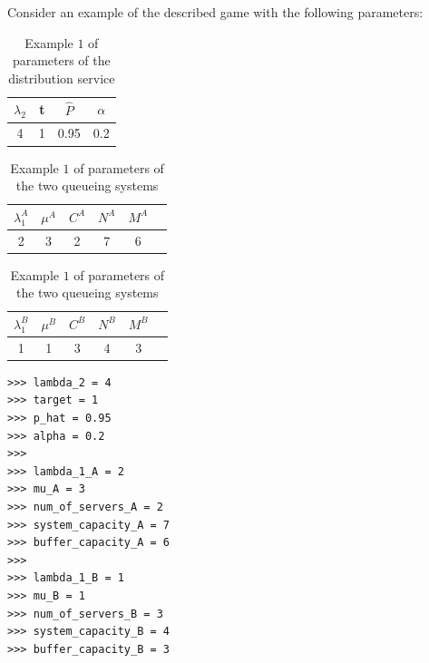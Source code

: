 Consider an example of the described game with the following parameters:

\begin{table}[H]
    \caption{Example \(1\) of parameters of the distribution service}
    \begin{center}
        \begin{tabular}{||c|c|c|c||}
            \hline
            \(\lambda_2\) & t & \footnotesize{\(\hat{P}\)} & \(\alpha\) \\
            \hline\hline
            4 & 1 & 0.95 & 0.2 \\
            \hline
        \end{tabular}
    \end{center}
    \label{tab:implemetation_dist_service_parameters}
\end{table}

\begin{table}[H]
    \caption{Example \(1\) of parameters of the two queueing systems}
    \begin{center}
        \begin{tabular}{||c|c|c|c|c|c||}
            \hline
            \(\lambda_1^A\) & \(\mu^A\) & \(C^A\) & \(N^A\) & \(M^A\) \\
            \hline
            2 & 3 & 2 & 7 & 6 \\
            \hline
        \end{tabular}

        \vspace{0.5cm}
        
        \begin{tabular}{||c|c|c|c|c|c||}
            \hline
            \(\lambda_1^B\) & \(\mu^B\) & \(C^B\) & \(N^B\) & \(M^B\) \\
            \hline
            1 & 1 & 3 & 4 & 3 \\
            \hline
        \end{tabular}
    \end{center}
    \label{tab:implemetation_queueing_systems_parameters}
\end{table}


\begin{lstlisting}[style=pystyle]
>>> lambda_2 = 4
>>> target = 1
>>> p_hat = 0.95
>>> alpha = 0.2
>>> 
>>> lambda_1_A = 2
>>> mu_A = 3
>>> num_of_servers_A = 2
>>> system_capacity_A = 7
>>> buffer_capacity_A = 6
>>> 
>>> lambda_1_B = 1
>>> mu_B = 1
>>> num_of_servers_B = 3
>>> system_capacity_B = 4
>>> buffer_capacity_B = 3

\end{lstlisting}

